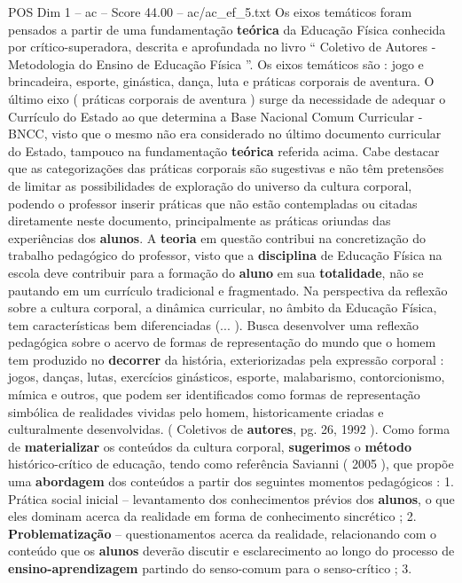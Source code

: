 \begin{textsample}{POS Dim 1 – ac – Score 44.00 – ac/ac\_ef\_5.txt}
Os eixos temáticos foram pensados a partir de uma fundamentação \textbf{teórica} da Educação Física conhecida por crítico-superadora, descrita e aprofundada no livro “ Coletivo de Autores - Metodologia do Ensino de Educação Física ”.
Os eixos temáticos são : jogo e brincadeira, esporte, ginástica, dança, luta e práticas corporais de aventura.
O último eixo ( práticas corporais de aventura ) surge da necessidade de adequar o Currículo do Estado ao que determina a Base Nacional Comum Curricular - BNCC, visto que o mesmo não era considerado no último documento curricular do Estado, tampouco na fundamentação \textbf{teórica} referida acima.
Cabe destacar que as categorizações das práticas corporais são sugestivas e não têm pretensões de limitar as possibilidades de exploração do universo da cultura corporal, podendo o professor inserir práticas que não estão contempladas ou citadas diretamente neste documento, principalmente as práticas oriundas das experiências dos \textbf{alunos}.
A \textbf{teoria} em questão contribui na concretização do trabalho pedagógico do professor, visto que a \textbf{disciplina} de Educação Física na escola deve contribuir para a formação do \textbf{aluno} em sua \textbf{totalidade}, não se pautando em um currículo tradicional e fragmentado.
Na perspectiva da reflexão sobre a cultura corporal, a dinâmica curricular, no âmbito da Educação Física, tem características bem diferenciadas (... ).
Busca desenvolver uma reflexão pedagógica sobre o acervo de formas de representação do mundo que o homem tem produzido no \textbf{decorrer} da história, exteriorizadas pela expressão corporal : jogos, danças, lutas, exercícios ginásticos, esporte, malabarismo, contorcionismo, mímica e outros, que podem ser identificados como formas de representação simbólica de realidades vividas pelo homem, historicamente criadas e culturalmente desenvolvidas. ( Coletivos de \textbf{autores}, pg. 26, 1992 ).
Como forma de \textbf{materializar} os conteúdos da cultura corporal, \textbf{sugerimos} o \textbf{método} histórico-crítico de educação, tendo como referência Savianni ( 2005 ), que propõe uma \textbf{abordagem} dos conteúdos a partir dos seguintes momentos pedagógicos : 1.
Prática social inicial – levantamento dos conhecimentos prévios dos \textbf{alunos}, o que eles dominam acerca da realidade em forma de conhecimento sincrético ; 2. \textbf{Problematização} – questionamentos acerca da realidade, relacionando com o conteúdo que os \textbf{alunos} deverão discutir e esclarecimento ao longo do processo de \textbf{ensino-aprendizagem} partindo do senso-comum para o senso-crítico ; 3.

\end{textsample}
